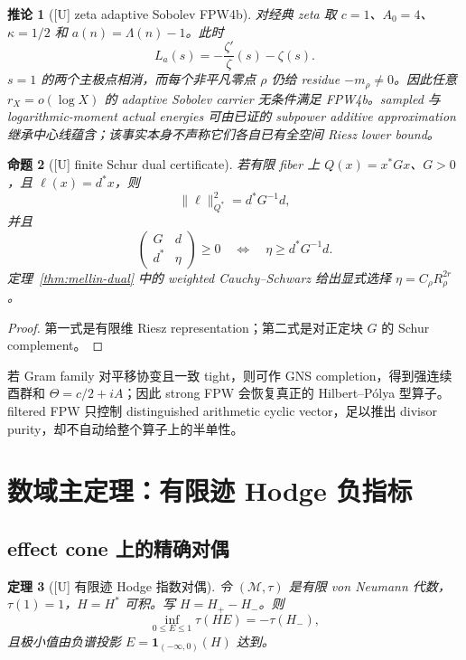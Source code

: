 \documentclass[UTF8,11pt,a4paper]{ctexart}
\newtheorem{theorem}{定理}[section]
\newtheorem{proposition}[theorem]{命题}
\newtheorem{corollary}[theorem]{推论}
\theoremstyle{definition}
\theoremstyle{remark}
\newcommand{\1}{\mathbf 1}
\newcommand{\cM}{\mathcal M}
\newcommand{\statusU}{\textnormal{[U]}}
\begin{document}
\begin{corollary}[\statusU{} zeta adaptive Sobolev FPW4b]\label{cor:zeta-fpw4b}
对经典 zeta 取 $c=1$、$A_0=4$、$\kappa=1/2$ 和 $a(n)=\Lambda(n)-1$。此时
\[
 L_a(s)=-\frac{\zeta'}{\zeta}(s)-\zeta(s).
\]
$s=1$ 的两个主极点相消，而每个非平凡零点 $\rho$ 仍给 residue $-m_\rho\ne0$。因此任意 $r_X=o(\log X)$ 的 adaptive Sobolev carrier 无条件满足 FPW4b。sampled 与 logarithmic-moment actual energies 可由已证的 subpower additive approximation 继承中心线蕴含；该事实本身不声称它们各自已有全空间 Riesz lower bound。
\end{corollary}

\begin{proposition}[\statusU{} finite Schur dual certificate]
若有限 fiber 上 $Q(x)=x^*Gx$、$G>0$，且 $\ell(x)=d^*x$，则
\[
 \|\ell\|_{Q^*}^2=d^*G^{-1}d,
\]
并且
\[
 \begin{pmatrix}G&d\\d^*&\eta\end{pmatrix}\geq0
 \quad\Longleftrightarrow\quad
 \eta\geq d^*G^{-1}d.
\]
定理~\ref{thm:mellin-dual} 中的 weighted Cauchy--Schwarz 给出显式选择 $\eta=C_\rho R_\rho^{2r}$。
\end{proposition}

\begin{proof}
第一式是有限维 Riesz representation；第二式是对正定块 $G$ 的 Schur complement。
\end{proof}

若 Gram family 对平移协变且一致 tight，则可作 GNS completion，得到强连续酉群和 $\Theta=c/2+iA$；因此 strong FPW 会恢复真正的 Hilbert--P\'olya 型算子。filtered FPW 只控制 distinguished arithmetic cyclic vector，足以推出 divisor purity，却不自动给整个算子上的半单性。

\section{数域主定理：有限迹 Hodge 负指标}

\subsection{effect cone 上的精确对偶}

\begin{theorem}[\statusU{} 有限迹 Hodge 指数对偶]\label{thm:trace-duality}
令 $(\cM,\tau)$ 是有限 von Neumann 代数，$\tau(1)=1$，$H=H^*$ 可积。写 $H=H_+-H_-$。则
\[
  \inf_{0\leq E\leq1}\tau(HE)=-\tau(H_-),
\]
且极小值由负谱投影 $E=\1_{(-\infty,0)}(H)$ 达到。
\end{theorem}
\end{document}
